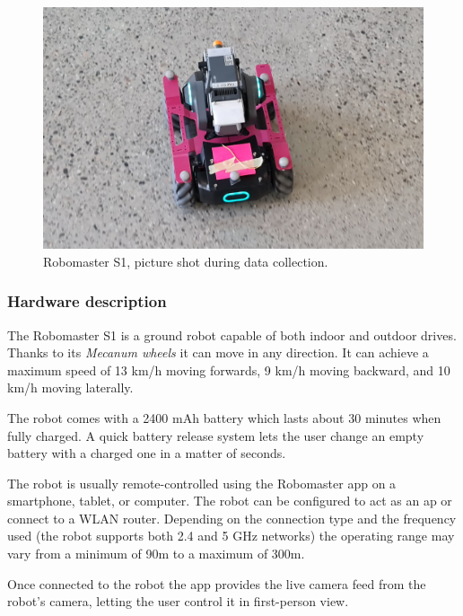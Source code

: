         \begin{figure}[htpb]
            \centering
            \centerline{\includegraphics[width=\textwidth]{img/robomaster.png}}
            \caption{Robomaster S1, picture shot during data collection.}
            \label{fig:robomaster}
        \end{figure}
        
        \subsubsection{Hardware description}
            The Robomaster S1 is a ground robot capable of both indoor and outdoor drives. Thanks to its \emph{Mecanum wheels} \cite{ilon1975wheels} it can move in any direction. It can achieve a maximum speed of 13 km/h moving forwards, 9 km/h moving backward, and 10 km/h moving laterally.

            The robot comes with a 2400 mAh battery which lasts about 30 minutes when fully charged. A quick battery release system lets the user change an empty battery with a charged one in a matter of seconds.
            
            The robot is usually remote-controlled using the Robomaster app on a smartphone, tablet, or computer. The robot can be configured to act as an \acrfull{ap} or connect to a WLAN router. Depending on the connection type and the frequency used (the robot supports both 2.4 and 5 GHz networks) the operating range may vary from a minimum of 90m to a maximum of 300m.
            
            Once connected to the robot the app provides the live camera feed from the robot's camera, letting the user control it in first-person view.
            
